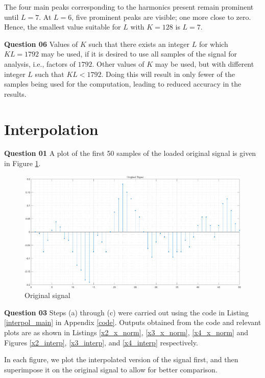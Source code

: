 \documentclass{article}[a4paper]
\begin{document}
	The four main peaks corresponding to the harmonics present remain prominent until $L=7$. At $L=6$, five prominent peaks are visible; one more close to zero. Hence, the smallest value suitable for $L$ with $K=128$ is $L=7$.
	\medskip
	
	\textbf{Question 06} Values of $K$ such that there exists an integer $L$ for which $KL = 1792$ may be used, if it is desired to use all samples of the signal for analysis, i.e., factors of $1792$. Other values of $K$ may be used, but with different integer $L$ such that $KL < 1792$. Doing this will result in only fewer of the samples being used for the computation, leading to reduced accuracy in the results.
	
	\section{Interpolation}
	
	\textbf{Question 01} A plot of the first 50 samples of the loaded original signal is given in Figure \ref{orig_x1}.
	
	\begin{figure}[H]
		\centering
		\includegraphics[width=0.9\linewidth]{images/q2_orig_sig.png}
		\caption{Original signal}
		\label{orig_x1}
	\end{figure}
	
	\textbf{Question 03} Steps (a) through (c) were carried out using the code in Listing \ref{interpol_main} in Appendix \ref{code}. Outputs obtained from the code and relevant plots are as shown in Listings \ref{x2_x_norm}, \ref{x3_x_norm}, \ref{x4_x_norm} and Figures \ref{x2_interp}, \ref{x3_interp}, and \ref{x4_interp} respectively.
	
	In each figure, we plot the interpolated version of the signal first, and then superimpose it on the original signal to allow for better comparison.
	
\end{document}

